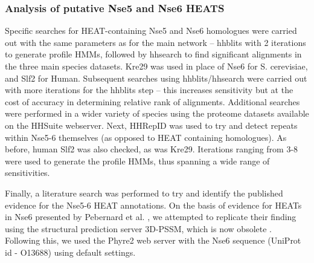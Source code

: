\documentclass[a4paper,11pt,twoside,openright]{scrbook}
\begin{document}
\subsubsection{Analysis of putative Nse5 and Nse6 HEATS}
Specific searches for HEAT-containing Nse5 and Nse6 homologues were carried out with the same parameters as for the main network – hhblits with 2 iterations to generate profile HMMs, followed by hhsearch to find significant alignments in the three main species datasets. Kre29 was used in place of Nse6 for S. cerevisiae, and Slf2 for Human. Subsequent searches using hhblits/hhsearch were carried out with more iterations for the hhblits step – this increases sensitivity but at the cost of accuracy in determining relative rank of alignments. Additional searches were performed in a wider variety of species using the proteome datasets available on the HHSuite webserver. Next, HHRepID \cite{Biegert2008} was used to try and detect repeats within Nse5-6 themselves (as opposed to HEAT containing homologues). As before, human Slf2 was also checked, as was Kre29. Iterations ranging from 3-8 were used to generate the profile HMMs, thus spanning a wide range of sensitivities.

Finally, a literature search was performed to try and identify the published evidence for the Nse5-6 HEAT annotations. On the basis of evidence for HEATs in Nse6 presented by Pebernard et al. \cite{Pebernard2006}, we attempted to replicate their finding using the structural prediction server 3D-PSSM, which is now obsolete \cite{Kelley2000}. Following this, we used the Phyre2 web server \cite{Kelley2015} with the Nse6 sequence (UniProt id - O13688) using default settings.
\end{document}
